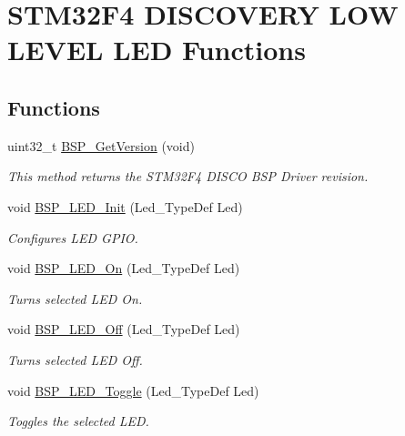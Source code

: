 \hypertarget{group___s_t_m32_f4___d_i_s_c_o_v_e_r_y___l_o_w___l_e_v_e_l___l_e_d___functions}{}\section{S\+T\+M32\+F4 D\+I\+S\+C\+O\+V\+E\+RY L\+OW L\+E\+V\+EL L\+ED Functions}
\label{group___s_t_m32_f4___d_i_s_c_o_v_e_r_y___l_o_w___l_e_v_e_l___l_e_d___functions}
\subsection*{Functions}
\begin{DoxyCompactItemize}
\item 
uint32\+\_\+t \mbox{\hyperlink{group___s_t_m32_f4___d_i_s_c_o_v_e_r_y___l_o_w___l_e_v_e_l___l_e_d___functions_ga65d13608f7010a8068614154cb142cd6}{B\+S\+P\+\_\+\+Get\+Version}} (void)
\begin{DoxyCompactList}\small\item\em This method returns the S\+T\+M32\+F4 D\+I\+S\+CO B\+SP Driver revision. \end{DoxyCompactList}\item 
void \mbox{\hyperlink{group___s_t_m32_f4___d_i_s_c_o_v_e_r_y___l_o_w___l_e_v_e_l___l_e_d___functions_gab58a4f16a476a53653c5c400e3bed158}{B\+S\+P\+\_\+\+L\+E\+D\+\_\+\+Init}} (Led\+\_\+\+Type\+Def Led)
\begin{DoxyCompactList}\small\item\em Configures L\+ED G\+P\+IO. \end{DoxyCompactList}\item 
void \mbox{\hyperlink{group___s_t_m32_f4___d_i_s_c_o_v_e_r_y___l_o_w___l_e_v_e_l___l_e_d___functions_gaee9c16b16384834c69efabf58f423d6f}{B\+S\+P\+\_\+\+L\+E\+D\+\_\+\+On}} (Led\+\_\+\+Type\+Def Led)
\begin{DoxyCompactList}\small\item\em Turns selected L\+ED On. \end{DoxyCompactList}\item 
void \mbox{\hyperlink{group___s_t_m32_f4___d_i_s_c_o_v_e_r_y___l_o_w___l_e_v_e_l___l_e_d___functions_gaef268680154ca15c45066d64d41f9467}{B\+S\+P\+\_\+\+L\+E\+D\+\_\+\+Off}} (Led\+\_\+\+Type\+Def Led)
\begin{DoxyCompactList}\small\item\em Turns selected L\+ED Off. \end{DoxyCompactList}\item 
void \mbox{\hyperlink{group___s_t_m32_f4___d_i_s_c_o_v_e_r_y___l_o_w___l_e_v_e_l___l_e_d___functions_ga1b9eabba7d498f41d6f16587ec0f9732}{B\+S\+P\+\_\+\+L\+E\+D\+\_\+\+Toggle}} (Led\+\_\+\+Type\+Def Led)
\begin{DoxyCompactList}\small\item\em Toggles the selected L\+ED. \end{DoxyCompactList}\end{DoxyCompactItemize}


